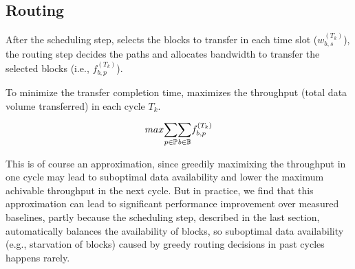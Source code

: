 

\subsection{Routing}
\label{subsec:logic:routing}

After the scheduling step, \name selects the blocks to transfer in each
time slot ($w^{(T_k)}_{b,s}$), the routing step decides the paths and
allocates bandwidth to transfer the selected blocks (i.e.,
$f_{b,p}^{(T_k)}$).

To minimize the transfer completion time, \name maximizes the
throughput (total data volume transferred) in each cycle $T_k$.

\begin{equation}
\centering
max \displaystyle{\sum_{p\in \mathbb{P}}}
\displaystyle{\sum_{b\in \mathbb{B}}}
f_{b,p}^{(T_k)}
\end{equation}

This is of course an approximation, since greedily maximixing the
throughput in one cycle may lead to suboptimal data availability and
lower the maximum achivable throughput in the next cycle. But in
practice, we find that this approximation can lead to significant
performance improvement over measured baselines, partly because the scheduling
step, described in the last section, automatically balances the
availability of blocks, so suboptimal data availability (e.g.,
starvation of blocks) caused by greedy routing decisions in past
cycles happens rarely.

